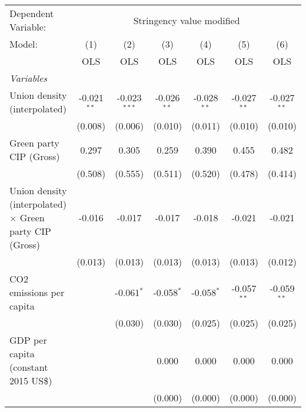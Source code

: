 
\begingroup
\centering
\begin{tabular}{lcccccc}
   \toprule
   Dependent Variable: & \multicolumn{6}{c}{Stringency value modified}\\
   Model:                                                         & (1)           & (2)            & (3)           & (4)           & (5)           & (6)\\  
                                                                  &  OLS          & OLS            & OLS           & OLS           & OLS           & OLS\\  
   \midrule
   \emph{Variables}\\
   Union density (interpolated)                                   & -0.021$^{**}$ & -0.023$^{***}$ & -0.026$^{**}$ & -0.028$^{**}$ & -0.027$^{**}$ & -0.027$^{**}$\\   
                                                                  & (0.008)       & (0.006)        & (0.010)       & (0.011)       & (0.010)       & (0.010)\\   
   Green party CIP (Gross)                                        & 0.297         & 0.305          & 0.259         & 0.390         & 0.455         & 0.482\\   
                                                                  & (0.508)       & (0.555)        & (0.511)       & (0.520)       & (0.478)       & (0.414)\\   
   Union density (interpolated) $\times$ Green party CIP (Gross)  & -0.016        & -0.017         & -0.017        & -0.018        & -0.021        & -0.021\\   
                                                                  & (0.013)       & (0.013)        & (0.013)       & (0.013)       & (0.013)       & (0.012)\\   
   CO2 emissions per capita                                       &               & -0.061$^{*}$   & -0.058$^{*}$  & -0.058$^{*}$  & -0.057$^{**}$ & -0.059$^{**}$\\   
                                                                  &               & (0.030)        & (0.030)       & (0.025)       & (0.025)       & (0.025)\\   
   GDP per capita (constant 2015 US\$)                            &               &                & 0.000         & 0.000         & 0.000         & 0.000\\   
                                                                  &               &                & (0.000)       & (0.000)       & (0.000)       & (0.000)\\   

\end{tabular}
